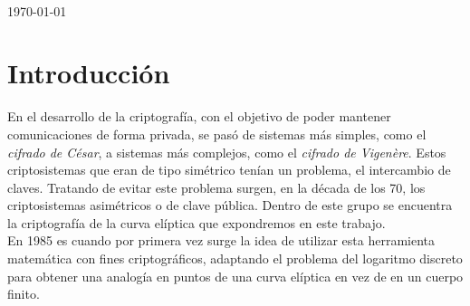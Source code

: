 \documentclass[11pt]{article}
\begin{document}
\begin{titlepage}
\centering
\vspace*{4.5cm}
\fontsize{30pt}{40pt}{\selectfont\sffamily{\textcolor{ColorTitulo}{Trabajo Teoría}}}\\
\vspace{5mm}
\fontsize{60pt}{50pt}{\selectfont\sffamily{\textcolor{ColorTitulo}{Curva Elíptica}}}
\vspace{1.5cm}

{\scshape\large \today \par}
\vspace{1cm}


\vspace*{\fill}
\vspace*{-2cm}

\end{titlepage}

\thispagestyle{empty}
\tableofcontents

\newpage

\section{Introducción}

En el desarrollo de la criptografía, con el objetivo de poder mantener comunicaciones de forma privada, se pasó de sistemas más simples, como el \textit{cifrado de César}, a sistemas más complejos, como el \textit{cifrado de Vigenère}. Estos criptosistemas que eran de tipo simétrico tenían un problema, el intercambio de claves. Tratando de evitar este problema surgen, en la década de los 70, los criptosistemas asimétricos o de clave pública. Dentro de este grupo se encuentra la criptografía de la curva elíptica que expondremos en este trabajo.\\

En 1985 es cuando por primera vez surge la idea de utilizar esta herramienta matemática con fines criptográficos, adaptando el problema del logaritmo discreto para obtener una analogía en puntos de una curva elíptica en vez de en un cuerpo finito.\\
\end{document}
